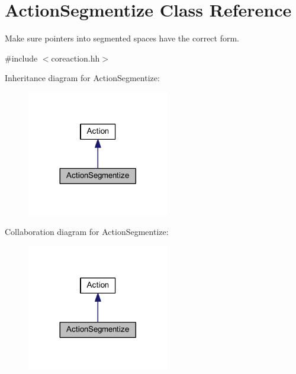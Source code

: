 \hypertarget{class_action_segmentize}{}\section{Action\+Segmentize Class Reference}
\label{class_action_segmentize}


Make sure pointers into segmented spaces have the correct form.  




{\ttfamily \#include $<$coreaction.\+hh$>$}



Inheritance diagram for Action\+Segmentize\+:
\nopagebreak
\begin{figure}[H]
\begin{center}
\leavevmode
\includegraphics[width=176pt]{class_action_segmentize__inherit__graph}
\end{center}
\end{figure}


Collaboration diagram for Action\+Segmentize\+:
\nopagebreak
\begin{figure}[H]
\begin{center}
\leavevmode
\includegraphics[width=176pt]{class_action_segmentize__coll__graph}
\end{center}
\end{figure}
